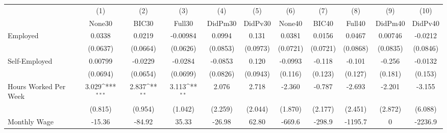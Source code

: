 {
\def\sym#1{\ifmmode^{#1}\else\(^{#1}\)\fi}
\begin{tabular}{l*{10}{c}}
\toprule
            &\multicolumn{1}{c}{(1)}&\multicolumn{1}{c}{(2)}&\multicolumn{1}{c}{(3)}&\multicolumn{1}{c}{(4)}&\multicolumn{1}{c}{(5)}&\multicolumn{1}{c}{(6)}&\multicolumn{1}{c}{(7)}&\multicolumn{1}{c}{(8)}&\multicolumn{1}{c}{(9)}&\multicolumn{1}{c}{(10)}\\
            &\multicolumn{1}{c}{None30}&\multicolumn{1}{c}{BIC30}&\multicolumn{1}{c}{Full30}&\multicolumn{1}{c}{DidPm30}&\multicolumn{1}{c}{DidPv30}&\multicolumn{1}{c}{None40}&\multicolumn{1}{c}{BIC40}&\multicolumn{1}{c}{Full40}&\multicolumn{1}{c}{DidPm40}&\multicolumn{1}{c}{DidPv40}\\
\midrule
Employed    &      0.0338         &      0.0219         &    -0.00984         &      0.0994         &       0.131         &      0.0381         &      0.0156         &      0.0467         &     0.00746         &     -0.0212         \\
            &    (0.0637)         &    (0.0664)         &    (0.0626)         &    (0.0853)         &    (0.0973)         &    (0.0721)         &    (0.0721)         &    (0.0868)         &    (0.0835)         &    (0.0846)         \\
\addlinespace
Self-Employed&     0.00799         &     -0.0229         &     -0.0284         &     -0.0853         &       0.120         &     -0.0993         &      -0.118         &      -0.101         &      -0.256         &     -0.0132         \\
            &    (0.0694)         &    (0.0654)         &    (0.0699)         &    (0.0826)         &    (0.0943)         &     (0.116)         &     (0.123)         &     (0.127)         &     (0.181)         &     (0.153)         \\
\addlinespace
Hours Worked Per Week&       3.029\sym{***}&       2.837\sym{**} &       3.113\sym{**} &       2.076         &       2.718         &      -2.360         &      -0.787         &      -2.693         &      -2.201         &      -3.155         \\
            &     (0.815)         &     (0.954)         &     (1.042)         &     (2.259)         &     (2.044)         &     (1.870)         &     (2.177)         &     (2.451)         &     (2.872)         &     (6.088)         \\
\addlinespace
Monthly Wage&      -15.36         &      -84.92         &       35.33         &      -26.98         &       62.80         &      -669.6         &      -298.9         &     -1195.7         &           0         &     -2236.9         \\

\end{tabular}}
